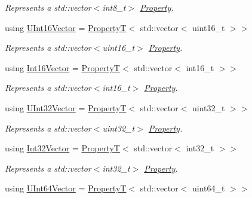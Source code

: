 \begin{DoxyCompactItemize}
\begin{DoxyCompactList}\small\item\em Represents a {\ttfamily std\+::vector$<$int8\+\_\+t$>$} \hyperlink{classdg_1_1deepcore_1_1_property}{Property}. \end{DoxyCompactList}\item 
using \hyperlink{group___process_properties_ga898c614111f39f3f942b385477705460}{U\+Int16\+Vector} = \hyperlink{structdg_1_1deepcore_1_1_property_t}{PropertyT}$<$ std\+::vector$<$ uint16\+\_\+t $>$$>$
\begin{DoxyCompactList}\small\item\em Represents a {\ttfamily std\+::vector$<$uint16\+\_\+t$>$} \hyperlink{classdg_1_1deepcore_1_1_property}{Property}. \end{DoxyCompactList}\item 
using \hyperlink{group___process_properties_gaa9edeb8c24adefc69d465f4b95b2ad77}{Int16\+Vector} = \hyperlink{structdg_1_1deepcore_1_1_property_t}{PropertyT}$<$ std\+::vector$<$ int16\+\_\+t $>$$>$
\begin{DoxyCompactList}\small\item\em Represents a {\ttfamily std\+::vector$<$int16\+\_\+t$>$} \hyperlink{classdg_1_1deepcore_1_1_property}{Property}. \end{DoxyCompactList}\item 
using \hyperlink{group___process_properties_ga7cc75489500ae42aa3122aadd51d3441}{U\+Int32\+Vector} = \hyperlink{structdg_1_1deepcore_1_1_property_t}{PropertyT}$<$ std\+::vector$<$ uint32\+\_\+t $>$$>$
\begin{DoxyCompactList}\small\item\em Represents a {\ttfamily std\+::vector$<$uint32\+\_\+t$>$} \hyperlink{classdg_1_1deepcore_1_1_property}{Property}. \end{DoxyCompactList}\item 
using \hyperlink{group___process_properties_gaa7c9adb7a8c1d38311c39122a846e5d8}{Int32\+Vector} = \hyperlink{structdg_1_1deepcore_1_1_property_t}{PropertyT}$<$ std\+::vector$<$ int32\+\_\+t $>$$>$
\begin{DoxyCompactList}\small\item\em Represents a {\ttfamily std\+::vector$<$int32\+\_\+t$>$} \hyperlink{classdg_1_1deepcore_1_1_property}{Property}. \end{DoxyCompactList}\item 
using \hyperlink{group___process_properties_gaea3792697747e659ee84e99497f27834}{U\+Int64\+Vector} = \hyperlink{structdg_1_1deepcore_1_1_property_t}{PropertyT}$<$ std\+::vector$<$ uint64\+\_\+t $>$$>$
$$
\end{DoxyCompactItemize}
